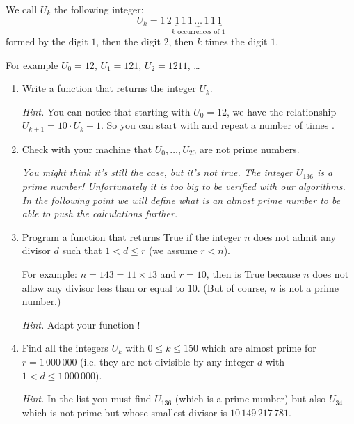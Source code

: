 \documentclass[11pt,class=report,crop=false]{standalone}
\begin{document}

\begin{activite}


We call $U_k$ the following integer:
$$U_k = 1\,2 \underbrace{1\,1\,1\,\ldots\,1\,1\,1}_{k \text{ occurrences of } 1}$$
formed by the digit $1$, then the digit $2$, then $k$ times the digit $1$.

For example $U_0 = 12$, $U_1 = 121$, $U_2 = 1211$, \ldots




\begin{enumerate}
  \item Write a function  that returns the integer $U_k$.
  
  \emph{Hint.} You can notice that starting with $U_0=12$, we have the relationship
  $U_{k+1} = 10 \cdot U_k + 1$. So you can start with  and repeat a number of times .
  
  \item Check with your machine that $U_0,\ldots,U_{20}$ are not prime numbers. 
  
  \medskip
  
 \emph{You might think it's still the case, but it's not true. The integer $U_{136}$ is a prime number! Unfortunately it is too big to be verified with our algorithms. In the following point we will define what is an \emph{almost prime number} to be able to push the calculations further.}
  
  \item Program a function  that returns \og{}True\fg{} if the integer $n$ does not admit any divisor $d$ such that $1< d \le r$ (we assume $r<n$). 
  
  For example: $n = 143 = 11 \times 13$ and $r=10$, then  is
  \og{}True\fg{} because $n$ does not allow any divisor less than or equal to $10$. (But of course, $n$ is not a prime number.)
  
  \emph{Hint.} Adapt your function !
  
  \item Find all the integers $U_k$ with $0\le k \le 150$ which are almost prime for 
  $r = 1 \,000\,000$ (i.e. they are not divisible by any integer $d$ with $1<d \le 1\,000\,000$).
  
  \emph{Hint.} In the list you must find $U_{136}$ (which is a prime number) but also $U_{34}$ which is not prime but whose smallest divisor is
  $10\,149\,217\,781$.
\end{enumerate}   
     
\end{activite}
\end{document}
